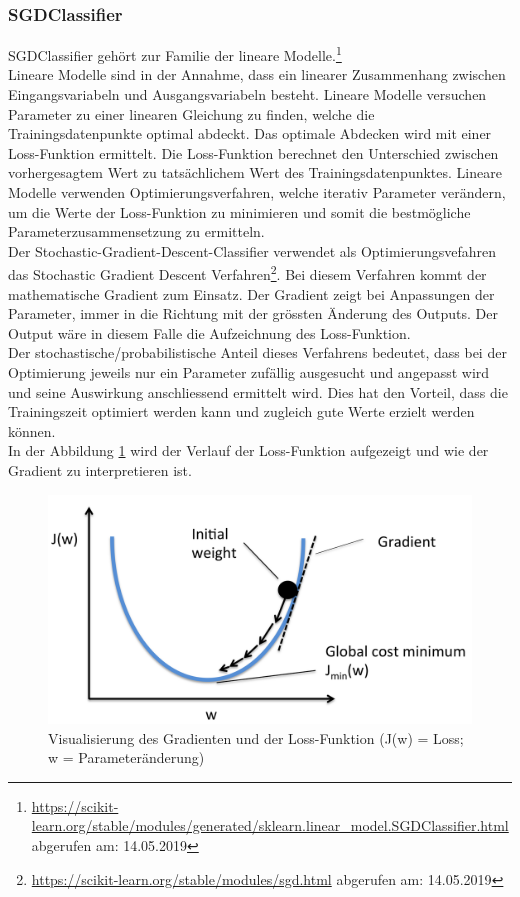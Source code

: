 \subsubsection{SGDClassifier}
SGDClassifier gehört zur Familie der lineare Modelle.\footnote{\url{https://scikit-learn.org/stable/modules/generated/sklearn.linear_model.SGDClassifier.html} abgerufen am: 14.05.2019}\\
Lineare Modelle sind in der Annahme, dass ein linearer Zusammenhang zwischen Eingangsvariabeln und Ausgangsvariabeln besteht.
Lineare Modelle versuchen Parameter zu einer linearen Gleichung zu finden, welche die Trainingsdatenpunkte optimal abdeckt.
Das optimale Abdecken wird mit einer Loss-Funktion ermittelt.
Die Loss-Funktion berechnet den Unterschied zwischen vorhergesagtem Wert zu tatsächlichem Wert des Trainingsdatenpunktes.
Lineare Modelle verwenden Optimierungsverfahren, welche iterativ Parameter verändern, um die Werte der Loss-Funktion zu minimieren und somit die bestmögliche Parameterzusammensetzung zu ermitteln.\\
Der \glqq Stochastic-Gradient-Descent-Classifier\grqq{} verwendet als Optimierungsvefahren das \glqq Stochastic Gradient Descent\grqq{} Verfahren\footnote{\url{https://scikit-learn.org/stable/modules/sgd.html} abgerufen am: 14.05.2019}.
Bei diesem Verfahren kommt der mathematische Gradient zum Einsatz.
Der Gradient zeigt bei Anpassungen der Parameter, immer in die Richtung mit der grössten Änderung des Outputs.
Der Output wäre in diesem Falle die Aufzeichnung des Loss-Funktion.\\
Der stochastische/probabilistische Anteil dieses Verfahrens bedeutet, dass bei der Optimierung jeweils nur ein Parameter zufällig ausgesucht und angepasst wird und seine Auswirkung anschliessend ermittelt wird.
Dies hat den Vorteil, dass die Trainingszeit optimiert werden kann und zugleich gute Werte erzielt werden können.\\
In der Abbildung \cref{fig:sgd} wird der Verlauf der Loss-Funktion aufgezeigt und wie der Gradient zu interpretieren ist.
\begin{figure}[H]	
	\includegraphics[width=1\columnwidth,keepaspectratio]{img/sgd.png}
	\caption{Visualisierung des Gradienten und der Loss-Funktion (J(w) = Loss; w = Parameteränderung)}
	\label{fig:sgd}
\end{figure}
